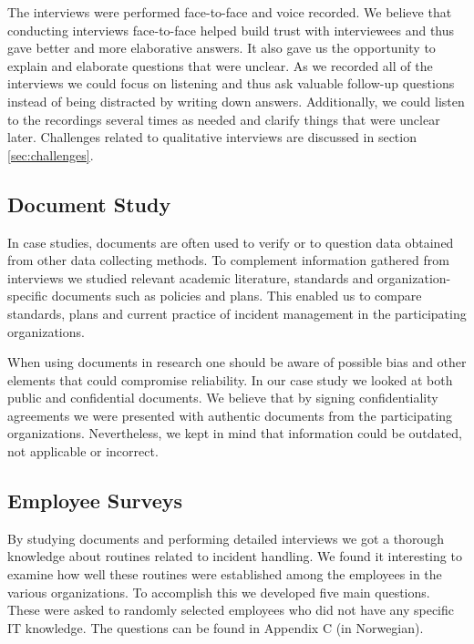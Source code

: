 The interviews were performed face-to-face and voice recorded. We believe that conducting interviews face-to-face helped build trust with interviewees and thus gave better and more elaborative answers. It also gave us the opportunity to explain and elaborate questions that were unclear. As we recorded all of the interviews we could focus on listening and thus ask valuable follow-up questions instead of being distracted by writing down answers. Additionally, we could listen to the recordings several times as needed and clarify things that were unclear later. Challenges related to qualitative interviews are discussed in section \ref{sec:challenges}.

\subsection{Document Study}
\label{sec:documentStudy}
In case studies, documents are often used to verify or to question data obtained from other data collecting methods. To complement information gathered from interviews we studied relevant academic literature, standards and organization-specific documents such as policies and plans. This enabled us to compare standards, plans and current practice of incident management in the participating organizations.

When using documents in research one should be aware of possible bias and other elements that could compromise reliability\cite{oates2005researching}. In our case study we looked at both public and confidential documents.  We believe that by signing confidentiality agreements we were presented with authentic documents from the participating organizations. Nevertheless, we kept in mind that information could be outdated, not applicable or incorrect.   

\subsection{Employee Surveys}
\label{sec:employeeSurveys}
By studying documents and performing detailed interviews we got a thorough knowledge about routines related to incident handling. We found it interesting to examine how well these routines were established among the employees in the various organizations. To accomplish this we developed five main questions. These were asked to randomly selected employees who did not have any specific IT knowledge. The questions can be found in Appendix C (in Norwegian).
 

